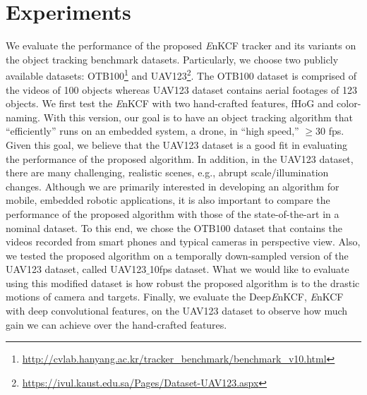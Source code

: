 \documentclass[10pt,twocolumn,letterpaper]{article}
\begin{document}
\section{Experiments} \label{sc:Experiments}
We evaluate the performance of the proposed {\it E}nKCF tracker and
its variants on the object tracking benchmark
datasets. Particularly, we choose two publicly available datasets:
OTB100\footnote{\url{http://cvlab.hanyang.ac.kr/tracker_benchmark/benchmark_v10.html}}
and
UAV123\footnote{\url{https://ivul.kaust.edu.sa/Pages/Dataset-UAV123.aspx}}\cite{mueller2016uav123}.
The OTB100 dataset is comprised of the videos of 100 objects whereas
UAV123 dataset contains aerial footages of 123 objects.  We first test
the {\it E}nKCF with two hand-crafted features, fHoG and color-naming.
With this version, our goal is to have an object tracking algorithm
that ``efficiently'' runs on an embedded system, a drone, in ``high
speed,'' $\ge 30$ fps. Given this goal, we believe that the UAV123
dataset is a good fit in evaluating the performance of the proposed
algorithm. In addition, in the UAV123 dataset, there are many
challenging, realistic scenes, e.g., abrupt scale/illumination
changes. Although we are primarily interested in developing an
algorithm for mobile, embedded robotic applications, it is also
important to compare the performance of the proposed algorithm with
those of the state-of-the-art in a nominal dataset. To this end, we
chose the OTB100 dataset that contains the videos recorded from smart
phones and typical cameras in perspective view. Also, we tested the
proposed algorithm on a temporally down-sampled version of the UAV123
dataset, called UAV123$\_$10fps dataset. What we would like to
evaluate using this modified dataset is how robust the proposed
algorithm is to the drastic motions of camera and targets. Finally, we
evaluate the Deep{\it E}nKCF, {\it E}nKCF with deep convolutional
features, on the UAV123 dataset to observe how much gain we can
achieve over the hand-crafted features.
\end{document}
